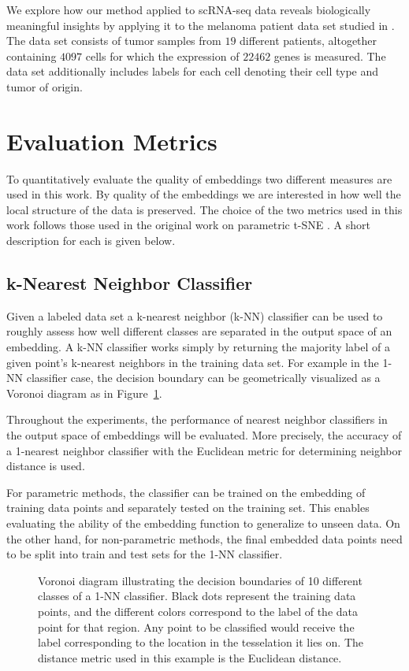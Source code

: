 We explore how our method applied to scRNA-seq data reveals biologically meaningful insights by applying it to the melanoma patient data set studied in \cite{tirosh}. The data set consists of tumor samples from $19$ different patients, altogether containing $4097$ cells for which the expression of $22462$ genes is measured. The data set additionally includes labels for each cell denoting their cell type and tumor of origin.

\section{Evaluation Metrics}

To quantitatively evaluate the quality of embeddings two different measures are used in this work. By quality of the embeddings we are interested in how well the local structure of the data is preserved. The choice of the two metrics used in this work follows those used in the original work on parametric t-SNE \cite{parametric_tsne}. A short description for each is given below.

\subsection{k-Nearest Neighbor Classifier}

Given a labeled data set a k-nearest neighbor (k-NN) classifier can be used to roughly assess how well different classes are separated in the output space of an embedding. A k-NN classifier works simply by returning the majority label of a given point's k-nearest neighbors in the training data set. For example in the 1-NN classifier case, the decision boundary can be geometrically visualized as a Voronoi diagram as in Figure~\ref{fig:voronoi}.

Throughout the experiments, the performance of nearest neighbor classifiers in the output space of embeddings will be evaluated. More precisely, the accuracy of a 1-nearest neighbor classifier with the Euclidean metric for determining neighbor distance is used.

For parametric methods, the classifier can be trained on the embedding of training data points and separately tested on the training set. This enables evaluating the ability of the embedding function to generalize to unseen data. On the other hand, for non-parametric methods, the final embedded data points need to be split into train and test sets for the 1-NN classifier.

\begin{figure}[!htb]
  \centering
  \resizebox{0.5\textwidth}{!}{\unskip}
  \caption{Voronoi diagram illustrating the decision boundaries of 10 different classes of a 1-NN classifier. Black dots represent the training data points, and the different colors correspond to the label of the data point for that region. Any point to be classified would receive the label corresponding to the location in the tesselation it lies on. The distance metric used in this example is the Euclidean distance.}
  \label{fig:voronoi}
\end{figure}

